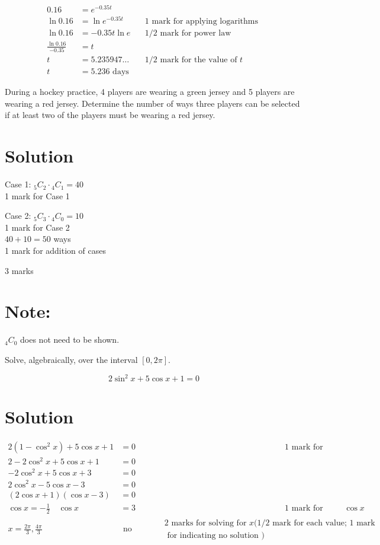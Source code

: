 \documentclass[10pt]{article}
\begin{document}
$$
\begin{aligned}
0.16 & =e^{-0.35 t} & & \\
\ln 0.16 & =\ln e^{-0.35 t} & & 1 \text { mark for applying logarithms } \\
\ln 0.16 & =-0.35 t \ln e & & 1 / 2 \text { mark for power law } \\
\frac{\ln 0.16}{-0.35} & =t & & \\
t & =5.235947 \ldots & & 1 / 2 \text { mark for the value of } t \\
t & =5.236 \text { days } & &
\end{aligned}
$$

During a hockey practice, 4 players are wearing a green jersey and 5 players are wearing a red jersey. Determine the number of ways three players can be selected if at least two of the players must be wearing a red jersey.

\section*{Solution}
Case 1: ${ }_{5} C_{2} \cdot{ }_{4} C_{1}=40$\\
1 mark for Case 1

Case 2: ${ }_{5} C_{3} \cdot{ }_{4} C_{0}=10$\\
1 mark for Case 2\\
$40+10=50$ ways\\
1 mark for addition of cases

3 marks

\section*{Note:}
${ }_{4} C_{0}$ does not need to be shown.

Solve, algebraically, over the interval $[0,2 \pi]$.

$$
2 \sin ^{2} x+5 \cos x+1=0
$$

\section*{Solution}
$$
\begin{aligned}
2\left(1-\cos ^{2} x\right)+5 \cos x+1 & =0 & & 1 \text { mark for substitution of an appropriate identity } \\
2-2 \cos ^{2} x+5 \cos x+1 & =0 & & \\
-2 \cos ^{2} x+5 \cos x+3 & =0 & & \\
2 \cos ^{2} x-5 \cos x-3 & =0 & & \\
(2 \cos x+1)(\cos x-3) & =0 & & \\
\cos x=-\frac{1}{2} \quad \cos x & =3 & & 1 \text { mark for solving for } \cos x \\
x=\frac{2 \pi}{3}, \frac{4 \pi}{3} & \text { no solution } & \begin{array}{l}
2 \text { marks for solving for } x(1 / 2 \text { mark for each value; } 1 \text { mark } \\
\text { for indicating no solution })
\end{array} &
\end{aligned}
$$
\end{document}
